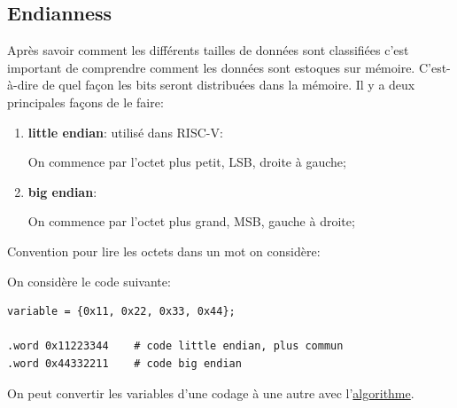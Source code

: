 \documentclass{article}
\begin{document}
\subsection{Endianness}
Après savoir comment les différents tailles de données sont classifiées c'est important de comprendre comment les données sont estoques sur mémoire. C'est-à-dire de quel façon les bits seront distribuées dans la mémoire. Il y a deux principales façons de le faire:
\begin{enumerate}[rightmargin = \leftmargin]
    \item \textbf{little endian}: utilisé dans RISC-V:
    \begin{definition}\label{def:littleEndian}
        On commence par l'octet plus petit, LSB, droite à gauche;
    \end{definition}
    
    \item \textbf{big endian}:
    \begin{definition}\label{def:bigEndian}
        On commence par l'octet plus grand, MSB, gauche à droite;
    \end{definition}
\end{enumerate}
Convention pour lire les octets dans un mot on considère:
\begin{example}
    On considère le code suivante:
    \begin{scriptsize}\myRISCV
        \begin{lstlisting}
variable = {0x11, 0x22, 0x33, 0x44};

.word 0x11223344    # code little endian, plus commun
.word 0x44332211    # code big endian
        \end{lstlisting}
    \end{scriptsize}
\end{example}
On peut convertir les variables d'une codage à une autre avec l'\href{https://codereview.stackexchange.com/questions/151049/endianness-conversion-in-c}{algorithme}.
\end{document}
